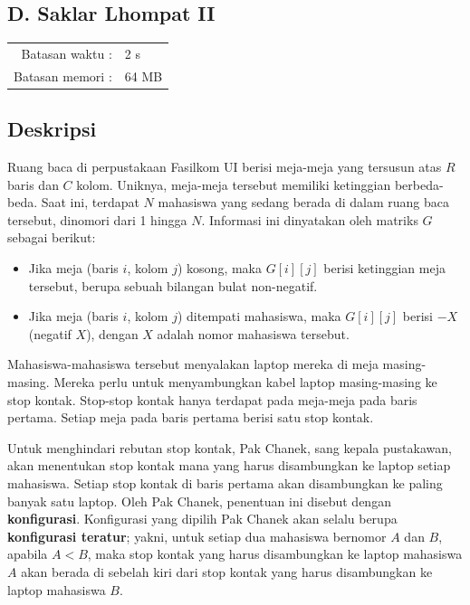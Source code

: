 \documentclass[../main_problemset.tex]{subfiles} %
\newcommand{\problemName}{D. Saklar Lhompat II}
\newcommand{\problemTL}{2 s}
\newcommand{\problemML}{64 MB}
\begin{document}
\begin{center}
    \section*{\problemName}
    \addcontentsline{toc}{section}{\problemName} %
    
    \begin{tabular}{rl}
    Batasan waktu : & \problemTL \\
    Batasan memori : & \problemML
    \end{tabular}
\end{center}

\subsection*{Deskripsi}

Ruang baca di perpustakaan Fasilkom UI berisi meja-meja yang tersusun atas $ R $ baris dan $ C $ kolom. Uniknya, meja-meja tersebut memiliki ketinggian berbeda-beda. Saat ini, terdapat $ N $ mahasiswa yang sedang berada di dalam ruang baca tersebut, dinomori dari 1 hingga $ N $. Informasi ini dinyatakan oleh matriks $ G $ sebagai berikut:

\begin{itemize}
	\item Jika meja (baris $ i $, kolom $ j $) kosong, maka $ G[i][j] $ berisi ketinggian meja tersebut, berupa sebuah bilangan bulat non-negatif.
	\item Jika meja (baris $ i $, kolom $ j $) ditempati mahasiswa, maka $ G[i][j] $ berisi $ -X $ (negatif $ X $), dengan $ X $ adalah nomor mahasiswa tersebut.
\end{itemize}

Mahasiswa-mahasiswa tersebut menyalakan laptop mereka di meja masing-masing. Mereka perlu untuk menyambungkan kabel laptop masing-masing ke stop kontak. Stop-stop kontak hanya terdapat pada meja-meja pada baris pertama. Setiap meja pada baris pertama berisi satu stop kontak.

Untuk menghindari rebutan stop kontak, Pak Chanek, sang kepala pustakawan, akan menentukan stop kontak mana yang harus disambungkan ke laptop setiap mahasiswa. Setiap stop kontak di baris pertama akan disambungkan ke paling banyak satu laptop. Oleh Pak Chanek, penentuan ini disebut dengan \textbf{konfigurasi}. Konfigurasi yang dipilih Pak Chanek akan selalu berupa \textbf{konfigurasi teratur}; yakni, untuk setiap dua mahasiswa bernomor $ A $ dan $ B $, apabila $ A < B $, maka stop kontak yang harus disambungkan ke laptop mahasiswa $ A $ akan berada di sebelah kiri dari stop kontak yang harus disambungkan ke laptop mahasiswa $ B $.
\end{document}
